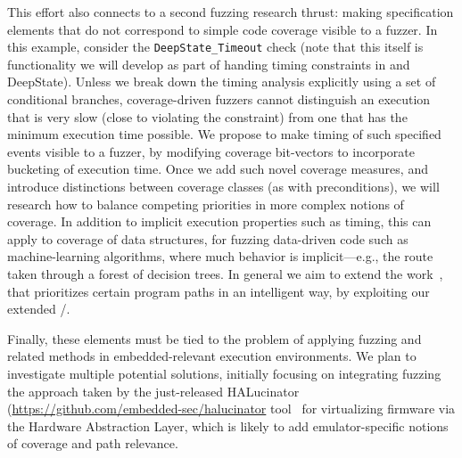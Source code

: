   This effort also connects to a second fuzzing research thrust: making specification elements that do not correspond to simple code coverage visible to a fuzzer.  In this example, consider the {\tt DeepState\_Timeout} check (note that this itself is functionality we will develop as part of handing timing constraints in \framac and DeepState).  Unless we break down the timing analysis explicitly using a set of conditional branches, coverage-driven fuzzers cannot distinguish an execution that is very slow (close to violating the constraint) from one that has the minimum execution time possible.  We propose to make timing of such specified events visible to a fuzzer, by modifying coverage bit-vectors to incorporate bucketing of execution time.  Once we add such novel coverage measures, and introduce distinctions between coverage classes (as with preconditions), we will research how to balance competing priorities in more complex notions of coverage.  In addition to implicit execution properties such as timing, this can apply to coverage of data structures, for fuzzing data-driven code such as machine-learning algorithms, where much behavior is implicit---e.g., the route taken through a forest of decision trees.  In general we aim to extend the work~\cite{aflfast,lemieux2018fairfuzz,vuzzer,zhao2019send,aschermann2019redqueen}, that prioritizes certain program paths in an intelligent way, by exploiting our extended \acsl/\eacsl.

Finally, these elements must be tied to the problem of applying fuzzing and related methods in embedded-relevant execution environments.  We plan to investigate multiple potential solutions, initially focusing on integrating fuzzing the approach taken by the just-released HALucinator (\url{https://github.com/embedded-sec/halucinator} tool~\cite{halucinator} for virtualizing firmware via the Hardware Abstraction Layer, which is likely to add emulator-specific notions of coverage and path relevance.

